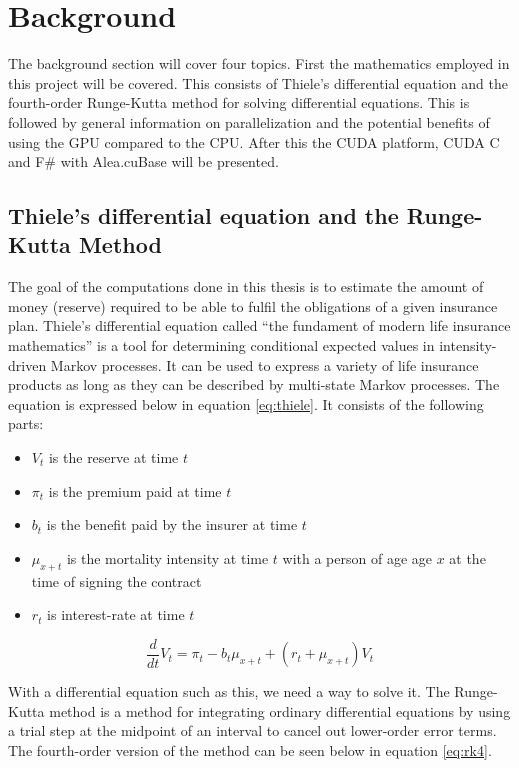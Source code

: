 \section{Background}
The background section will cover four topics.
First the mathematics employed in this project will be covered. 
This consists of Thiele's differential equation and the fourth-order Runge-Kutta method for solving differential equations.
This is followed by general information on parallelization and the potential benefits of using the GPU compared to the CPU.
After this the CUDA platform, CUDA C and F\# with Alea.cuBase will be presented.


\subsection{Thiele's differential equation and the Runge-Kutta Method}
The goal of the computations done in this thesis is to estimate the amount of money (reserve) required to be able to fulfil the obligations of a given insurance plan.
Thiele's differential equation\cite{thiele} called ``the fundament of modern life insurance mathematics''\cite{thiele:quote} is a tool for determining conditional expected values in intensity-driven Markov processes.
It can be used to express a variety of life insurance products as long as they can be described by multi-state Markov processes.
The equation is expressed below in equation \ref{eq:thiele}. It consists of the following parts:

\begin{itemize}
\item $V_t$ is the reserve at time $t$
\item $\pi_t$ is the premium paid at time $t$
\item $b_t$ is the benefit paid by the insurer at time $t$
\item $\mu_{x+t}$ is the mortality intensity at time $t$ with a person of age age $x$ at the time of signing the contract
\item $r_t$ is interest-rate at time $t$
\end{itemize}

\begin{equation}\label{eq:thiele}
\frac{d}{dt}V_t = \pi_t - b_t \mu_{x+t} + (r_t + \mu_{x+t}) V_t
\end{equation}

With a differential equation such as this, we need a way to solve it. 
The Runge-Kutta method\cite{runge-kutta} is a method for integrating ordinary differential equations by using a trial step at the midpoint of an interval to cancel out lower-order error terms.
The fourth-order version of the method can be seen below in equation \ref{eq:rk4}.

